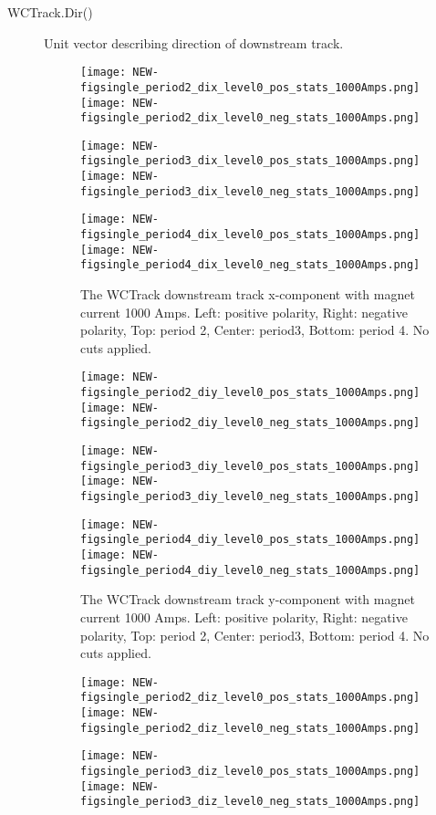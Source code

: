 \begin{description}
{}
\item[WCTrack.Dir()]{
Unit vector describing direction of downstream track.

       \begin{figure}[h]	   
         \centering   
        	\texttt{[image: NEW-figsingle\_period2\_dix\_level0\_pos\_stats\_1000Amps.png]}
	 \texttt{[image: NEW-figsingle\_period2\_dix\_level0\_neg\_stats\_1000Amps.png]}
	 
   	\texttt{[image: NEW-figsingle\_period3\_dix\_level0\_pos\_stats\_1000Amps.png]}
	 \texttt{[image: NEW-figsingle\_period3\_dix\_level0\_neg\_stats\_1000Amps.png]}
	 
 	\texttt{[image: NEW-figsingle\_period4\_dix\_level0\_pos\_stats\_1000Amps.png]}
	 \texttt{[image: NEW-figsingle\_period4\_dix\_level0\_neg\_stats\_1000Amps.png]}
   \caption[short]{The WCTrack downstream track x-component with magnet current 1000 Amps. Left: positive polarity, Right: negative polarity, Top: period 2, Center: period3,  Bottom: period 4. No cuts applied.}
   \label{fig_dix}
  \end{figure}
  
  
       \begin{figure}[h]	   
         \centering   
        	\texttt{[image: NEW-figsingle\_period2\_diy\_level0\_pos\_stats\_1000Amps.png]}
	 \texttt{[image: NEW-figsingle\_period2\_diy\_level0\_neg\_stats\_1000Amps.png]}
	 
   	\texttt{[image: NEW-figsingle\_period3\_diy\_level0\_pos\_stats\_1000Amps.png]}
	 \texttt{[image: NEW-figsingle\_period3\_diy\_level0\_neg\_stats\_1000Amps.png]}
	 
 	\texttt{[image: NEW-figsingle\_period4\_diy\_level0\_pos\_stats\_1000Amps.png]}
	 \texttt{[image: NEW-figsingle\_period4\_diy\_level0\_neg\_stats\_1000Amps.png]}
   \caption[short]{The WCTrack downstream track y-component with magnet current 1000 Amps. Left: positive polarity, Right: negative polarity, Top: period 2, Center: period3,  Bottom: period 4. No cuts applied.}
   \label{fig_diy}
  \end{figure}
  
         \begin{figure}[h]	
         \centering   
        	\texttt{[image: NEW-figsingle\_period2\_diz\_level0\_pos\_stats\_1000Amps.png]}
	 \texttt{[image: NEW-figsingle\_period2\_diz\_level0\_neg\_stats\_1000Amps.png]}
	 
   	\texttt{[image: NEW-figsingle\_period3\_diz\_level0\_pos\_stats\_1000Amps.png]}
	 \texttt{[image: NEW-figsingle\_period3\_diz\_level0\_neg\_stats\_1000Amps.png]}
	 

\end{figure}}
\end{description}
